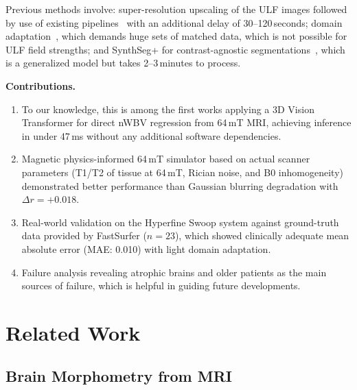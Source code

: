 \documentclass{ieeeaccess}
\begin{document}
Previous methods involve: super-resolution upscaling of the ULF images
followed by use of existing pipelines~\cite{iglesias2023synthsr} with an
additional delay of 30--120\,seconds; domain
adaptation~\cite{chen2019synergistic}, which demands huge sets of matched
data, which is not possible for ULF field strengths; and SynthSeg+ for
contrast-agnostic segmentations~\cite{billot2023synthseg}, which is a
generalized model but takes 2--3\,minutes to process.

\textbf{Contributions.}
\begin{enumerate}
  \item To our knowledge, this is among the first works applying a 3D
        Vision Transformer for direct nWBV regression from 64\,mT MRI,
        achieving inference in under 47\,ms without any additional software
        dependencies.
  \item Magnetic physics-informed 64\,mT simulator based on actual scanner
        parameters (T1/T2 of tissue at 64\,mT, Rician noise, and B0
        inhomogeneity) demonstrated better performance than Gaussian blurring
        degradation with $\Delta r = +0.018$.
  \item Real-world validation on the Hyperfine Swoop system against
        ground-truth data provided by FastSurfer ($n=23$), which showed
        clinically adequate mean absolute error (MAE: 0.010) with light
        domain adaptation.
  \item Failure analysis revealing atrophic brains and older patients as the
        main sources of failure, which is helpful in guiding future
        developments.
\end{enumerate}

\section{Related Work}
\label{sec:related}

\subsection{Brain Morphometry from MRI}
\end{document}
